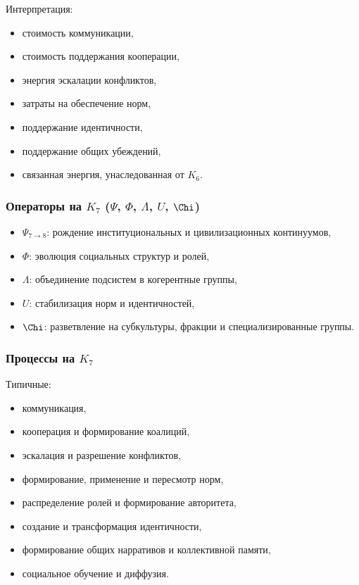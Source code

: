 Интерпретация:
\begin{itemize}
    \item стоимость коммуникации,
    \item стоимость поддержания кооперации,
    \item энергия эскалации конфликтов,
    \item затраты на обеспечение норм,
    \item поддержание идентичности,
    \item поддержание общих убеждений,
    \item связанная энергия, унаследованная от $K_6$.
\end{itemize}

\subsubsection{Операторы на \texorpdfstring{$K_7$}{K_7} (\texorpdfstring{$\Psi$}{\Psi}, \texorpdfstring{$\Phi$}{\Phi}, \texorpdfstring{$\Lambda$}{\Lambda}, \texorpdfstring{$U$}{U}, \texorpdfstring{$\Chi$}{\Chi})}

\begin{itemize}
    \item $\Psi_{7\to8}$: рождение институциональных и цивилизационных континуумов,
    \item $\Phi$: эволюция социальных структур и ролей,
    \item $\Lambda$: объединение подсистем в когерентные группы,
    \item $U$: стабилизация норм и идентичностей,
    \item $\Chi$: разветвление на субкультуры, фракции и специализированные группы.
\end{itemize}

\subsubsection{Процессы на \texorpdfstring{$K_7$}{K_7}}

Типичные:
\begin{itemize}
    \item коммуникация,
    \item кооперация и формирование коалиций,
    \item эскалация и разрешение конфликтов,
    \item формирование, применение и пересмотр норм,
    \item распределение ролей и формирование авторитета,
    \item создание и трансформация идентичности,
    \item формирование общих нарративов и коллективной памяти,
    \item социальное обучение и диффузия.
\end{itemize}

